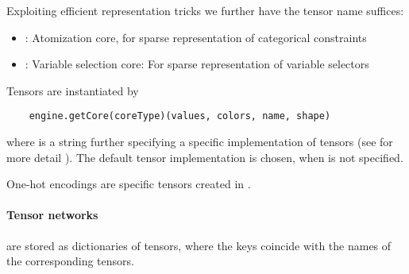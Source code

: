 Exploiting efficient representation tricks we further have the tensor name suffices:
\begin{itemize}
	\item \atoCoreSuf: Atomization core, for sparse representation of categorical constraints
	\item \vselCoreSuf: Variable selection core: For sparse representation of variable selectors
\end{itemize}

Tensors are instantiated by
\begin{lstlisting}
	engine.getCore(coreType)(values, colors, name, shape)
\end{lstlisting}
where  is a string further specifying a specific implementation of tensors (see for more detail ).
The default tensor implementation  is chosen, when  is not specified.



One-hot encodings are specific tensors created in \sprepresentation.

\subsect{\bncontractions}
\paragraph{Tensor networks} are stored as dictionaries of tensors, where the keys coincide with the names of the corresponding tensors.

